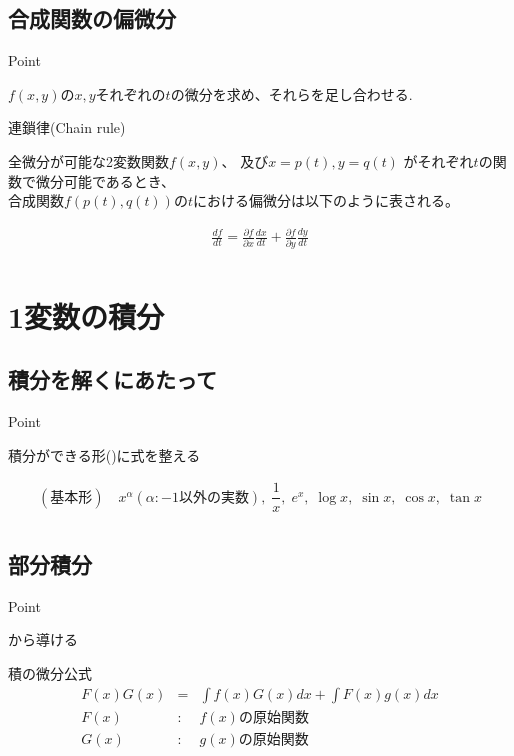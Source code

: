 \documentclass[a4paper]{jsarticle}
\begin{document}
\subsection{合成関数の偏微分}
\begin{itembox}[l]{Point}
    \begin{center}
        $f\left(x,y\right)$の$x,y$それぞれの$t$の微分を求め、それらを足し合わせる.
    \end{center}
\end{itembox}
\begin{itembox}[l]{連鎖律(Chain rule)}
    \begin{center}
        全微分が可能な2変数関数$f\left(x,y\right)$、
        及び$x=p\left(t\right),y=q\left(t\right)$ がそれぞれ$t$の関数で微分可能であるとき、\\
        合成関数$f\left(p\left(t\right),q\left(t\right)\right)$の$t$における偏微分は以下のように表される。
    \end{center}
    \begin{eqnarray*}
        \frac{df}{dt}=\frac{\partial f}{\partial x}\frac{dx}{dt} + \frac{\partial f}{\partial y}\frac{dy}{dt}\\
    \end{eqnarray*}
\end{itembox}
\section{1変数の積分}
\subsection{積分を解くにあたって}
\begin{itembox}[l]{Point}
    \begin{center}
        積分ができる形()に式を整える\\
    \end{center}
    \begin{eqnarray*}
        (基本形)\quad x^\alpha\!(\alpha:-1以外の実数),\; \dfrac{1}{x},\; e^x,\; \log x,\; \sin x,\; \cos x,\; \tan x\\
    \end{eqnarray*}
\end{itembox}
\subsection{部分積分}
\begin{itembox}[l]{Point}
    \begin{center}
        から導ける
    \end{center}
\end{itembox}
\begin{itembox}[l]{積の微分公式}
    \begin{eqnarray*}
        F\left(x\right)G\left(x\right)&=&\displaystyle\int f\left(x\right)G\left(x\right)dx+\int F\left(x\right)g\left(x\right)dx\\
        F\left(x\right)&:&f\left(x\right)の原始関数\\
        G\left(x\right)&:&g\left(x\right)の原始関数\\
    \end{eqnarray*}
\end{itembox}
\end{document}
